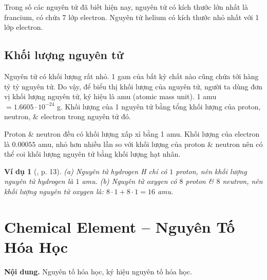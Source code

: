 \documentclass{article}
\newtheorem{vidu}{Ví dụ}
\begin{document}
Trong số các nguyên tử đã biết hiện nay, nguyên tử có kích thước lớn nhất là francium, có chứa 7 lớp electron. Nguyên tử helium có kích thước nhỏ nhất với 1 lớp electron.

\subsection{Khối lượng nguyên tử}
Nguyên tử có khối lượng rất nhỏ. 1 gam của bất kỳ chất nào cũng chứa tới hàng tỷ tỷ nguyên tử. Do vậy, để biểu thị khối lượng của nguyên tử, người ta dùng đơn vị khối lượng nguyên tử, ký hiệu là amu (atomic mass unit). 1 amu $= 1.6605\cdot10^{-24}$ g. Khối lượng của 1 nguyên tử bằng tổng khối lượng của proton, neutron, \& electron trong nguyên tử đó.

Proton \& neutron đều có khối lượng xấp xỉ bằng 1 amu. Khối lượng của electron là $0.00055$ amu, nhỏ hơn nhiều lần so với khối lượng của proton \& neutron nên có thể coi khối lượng nguyên tử bằng khối lượng hạt nhân.

\begin{vidu}[\cite{SGK_KHTN_7_Canh_Dieu}, p. 13]
	(a) Nguyên tử hydrogen \emph{H} chỉ có $1$ proton, nên khối lượng nguyên tử hydrogen là $1$ amu. (b) Nguyên tử oxygen có $8$ proton \& $8$ neutron, nên khối lượng nguyên tử oxygen là: $8\cdot1 + 8\cdot1 = 16$ amu.
\end{vidu}
\noindent{}


\section{Chemical Element -- Nguyên Tố Hóa Học}
\textsf{\textbf{Nội dung.} Nguyên tố hóa học, ký hiệu nguyên tố hóa học.}
\end{document}
